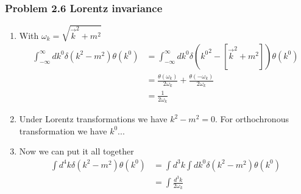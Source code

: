 \documentclass[10pt,a4paper]{book}
\theoremstyle{definition}
\begin{document}
\subsubsection{Problem 2.6 Lorentz invariance}
\begin{enumerate}
    \item With $\omega_k=\sqrt{\vec{k}^2+m^2}$
    \begin{align}
        \int_{-\infty}^\infty dk^0\delta(k^2-m^2)\theta(k^0)
        &=\int_{-\infty}^\infty dk^0\delta({k^0}^2-[\vec{k}^2+m^2])\theta(k^0)\\
        &=\frac{\theta(\omega_k)}{2\omega_k}+\frac{\theta(-\omega_k)}{2\omega_k}\\
        &=\frac{1}{2\omega_k}
    \end{align}
    \item Under Lorentz transformations we have $k^2-m^2=0$. For orthochronous transformation we have $k^0 ...$
    \item Now we can put it all together
    \begin{align}
        \int d^4k\delta(k^2-m^2)\theta(k^0)
        &=\int d^3k\int dk^0\delta(k^2-m^2)\theta(k^0)\\
        &=\int\frac{d^3k}{2\omega_k}
    \end{align}
\end{enumerate}
\end{document}
